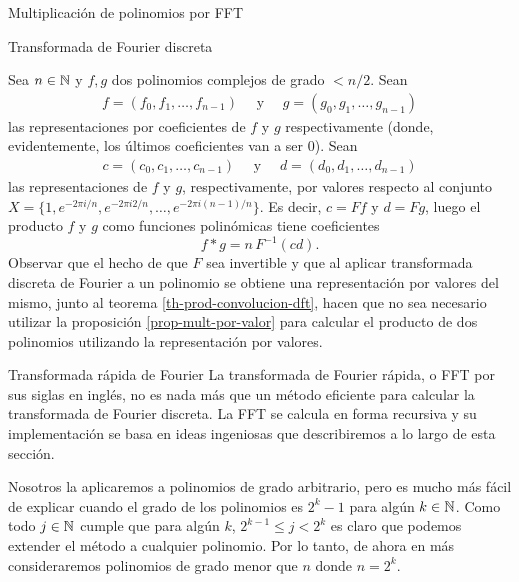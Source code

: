 \begin{chapter}{Multiplicación de polinomios por FFT}
\begin{section}{Transformada de Fourier discreta}
\begin{ejemplo*}
      Sea $n \in \mathbb N$ y $f, g$ dos polinomios complejos de grado $< n/2$. Sean
      \begin{align*}
          f = (f_0, f_1, \ldots, f_{n-1}) \quad \text{ y } \quad g = (g_0, g_1, \ldots, g_{n-1})
      \end{align*}
      las representaciones por coeficientes de $f$ y $g$ respectivamente (donde, evidentemente, los últimos coeficientes van a ser $0$). Sean
      \begin{align*}
          c = (c_0, c_1, \ldots, c_{n-1}) \quad \text{ y } \quad d = (d_0, d_1, \ldots, d_{n-1})
      \end{align*}
      las representaciones de $f$ y $g$, respectivamente, por valores respecto al conjunto $X = \{1, e^{-2\pi i /{n}},e^{-2\pi i 2/{n}}, \ldots,e^{-2\pi i {(n-1)}/{n}} \}$. Es decir, $c = Ff$ y $d = Fg$,  luego el producto $f$ y $g$ como funciones polinómicas tiene coeficientes
      \begin{equation*}
          f * g = n\,  F^{-1}(cd).
      \end{equation*}
      Observar que el hecho de que $F$ sea invertible y  que al aplicar transformada discreta de Fourier a un polinomio se obtiene una representación por valores del mismo, junto al teorema \ref{th-prod-convolucion-dft}, hacen que no sea necesario utilizar la proposición \ref{prop-mult-por-valor} para calcular el producto de dos polinomios utilizando la representación por valores.
  \end{ejemplo*}

 \end{section}

 \begin{section}{Transformada rápida de Fourier} La transformada de Fourier rápida, o FFT por sus siglas en inglés, no es nada más que un método eficiente para calcular la transformada de Fourier discreta. La FFT se calcula en forma recursiva y su implementación se basa en ideas ingeniosas que describiremos a lo largo de esta sección.

  Nosotros la aplicaremos a polinomios de grado arbitrario, pero es mucho más fácil de explicar cuando el grado de los polinomios es $2^k -1$  para algún $k \in \mathbb N$. Como todo $j \in \mathbb N$ cumple que para algún $k$, $2^{k-1} \le j < 2^k$ es claro que podemos extender el método a cualquier polinomio. Por lo tanto, de ahora en más consideraremos polinomios de grado menor que $n$ donde  $n = 2^k$.


\end{section}
\end{chapter}
